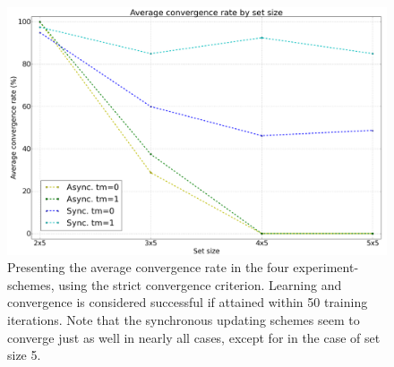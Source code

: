 \begin{figure}
    \centering
    \includegraphics[width=13cm]{fig/avg_convergence_rate_cut}
    \caption{Presenting the average convergence rate in the four experiment-schemes, using the strict convergence criterion. Learning and convergence is considered successful if attained within 50 training iterations. Note that the synchronous updating schemes seem to converge just as well in nearly all cases, except for in the case of set size 5.}
    \label{fig:convergence_rates_async_sync}
\end{figure}

